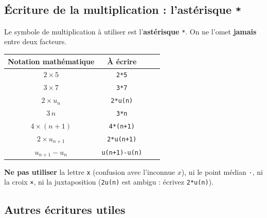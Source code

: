 \documentclass[11pt,a4paper]{article}
\begin{document}
\subsection{Écriture de la multiplication : l'astérisque \texttt{*}}

Le symbole de multiplication à utiliser est l'\textbf{astérisque} \verb|*|.
On ne l'omet \textbf{jamais} entre deux facteurs.

\begin{center}
\renewcommand{\arraystretch}{1.35}
\begin{tabular}{cc>{\ttfamily}cc}
\toprule
\textbf{Notation mathématique} & \textbf{À écrire} \\
\midrule
\(2 \times 5\)          & \verb|2*5| \\
\(3 \times 7\)          & \verb|3*7| \\
\(2 \times u_n\)        & \verb|2*u(n)| \\
\(3\,n\)                & \verb|3*n| \\
\(4 \times (n+1)\)      & \verb|4*(n+1)| \\
\(2 \times u_{n+1}\)    & \verb|2*u(n+1)| \\
\(u_{n+1} - u_n\)       & \verb|u(n+1)-u(n)| \\
\bottomrule
\end{tabular}
\end{center}

\begin{attention}
\textbf{Ne pas utiliser} la lettre \texttt{x} (confusion avec l'inconnue \(x\)),
ni le point médian \texttt{·}, ni la croix \texttt{×}, ni la juxtaposition
(\verb|2u(n)| est ambigu : écrivez \verb|2*u(n)|).
\end{attention}

\subsection{Autres écritures utiles}
\end{document}

